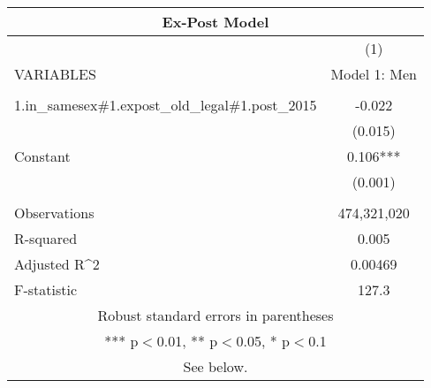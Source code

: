 \begin{tabular}{lc}
\multicolumn{2}{c}{Ex-Post Model} \\ \hline
 & (1) \\
VARIABLES & Model 1: Men \\ \hline
 &  \\
1.in\_samesex\#1.expost\_old\_legal\#1.post\_2015 & -0.022 \\
 & (0.015) \\
Constant & 0.106*** \\
 & (0.001) \\
 &  \\
Observations & 474,321,020 \\
R-squared & 0.005 \\
Adjusted R^2 & 0.00469 \\
 F-statistic & 127.3 \\ \hline
\multicolumn{2}{c}{ Robust standard errors in parentheses} \\
\multicolumn{2}{c}{ *** p$<$0.01, ** p$<$0.05, * p$<$0.1} \\
\multicolumn{2}{c}{ See below.} \\
\end{tabular}
